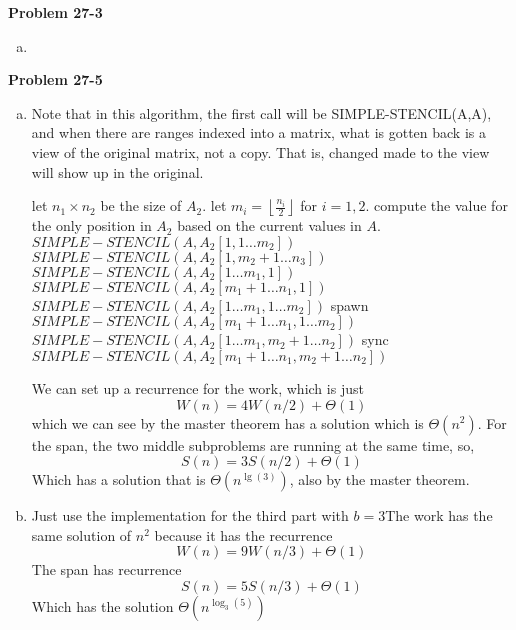 \documentclass{article}
\begin{document}
\noindent\textbf{Problem 27-3}\\
\begin{enumerate}[a.]
\item
\end{enumerate}



\noindent\textbf{Problem 27-5}\\
\begin{enumerate}[a.]
\item Note that in this algorithm, the first call will be SIMPLE-STENCIL(A,A), and when there are ranges indexed into a matrix, what is gotten back is a view of the original matrix, not a copy. That is, changed made to the view will show up in the original.
\begin{algorithm}
\caption{$SIMPLE-STENCIL(A,A_2)$}
\begin{algorithmic}
\State let $n_1\times n_2$ be the size of $A_2$.
\State let $m_i = \left\lfloor \frac{n_i}{2}\right\rfloor$ for $i=1,2$. 
\State compute the value for the only position in $A_2$ based on the current values in $A$.
\Else
\State $SIMPLE-STENCIL(A, A_2[1,1\ldots m_2])$
\State $SIMPLE-STENCIL(A, A_2[1,m_2+1 \ldots n_3])$
\EndIf
\Else
{}
\State $SIMPLE-STENCIL(A, A_2[1\ldots m_1,1])$
\State $SIMPLE-STENCIL(A, A_2[m_1+1 \ldots n_1,1])$
\Else
\State $SIMPLE-STENCIL(A, A_2[1\ldots m_1,1\ldots m_2])$
\State spawn $SIMPLE-STENCIL(A, A_2[ m_1+1 \ldots n_1,1\ldots m_2])$
\State  $SIMPLE-STENCIL(A, A_2[1 \ldots m_1,m_2+1 \ldots n_2])$
\State sync
\State  $SIMPLE-STENCIL(A, A_2[ m_1+1 \ldots n_1,m_2+1\ldots n_2])$
\EndIf
\EndIf
\end{algorithmic}
\end{algorithm}
We can set up a recurrence for the work, which is just
\[
W(n) = 4 W(n/2) + \Theta(1)
\]
which we can see by the master theorem has a solution which is $\Theta(n^2)$. For the span, the two middle subproblems are running at the same time, so,
\[
S(n) = 3 S(n/2) +\Theta(1)
\]
Which has a solution that is $\Theta(n^{\lg(3)})$, also by the master theorem.
\item
Just use the implementation for the third part with $b=3$The work has the same solution of $n^2$ because it has the recurrence
\[
W(n) = 9 W(n/3) + \Theta(1)
\]
The span has recurrence
\[
S(n) = 5 S(n/3) + \Theta(1)
\]
Which has the solution $\Theta(n^{\log_3(5)})$


\end{enumerate}
\end{document}
